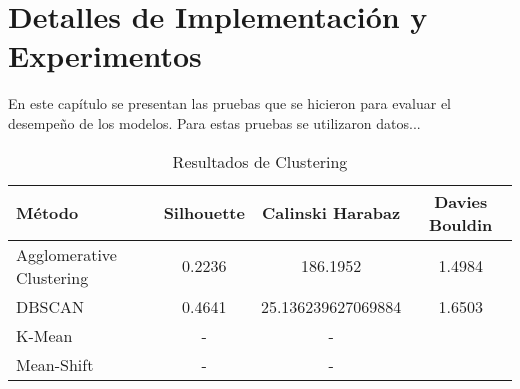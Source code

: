 \chapter{Detalles de Implementación y Experimentos}\label{chapter:implementation}

En este capítulo se presentan las pruebas que se hicieron para evaluar
 el desempeño de los modelos. Para estas pruebas se utilizaron datos...

\begin{table}[ht]
    \centering
    \caption{Resultados de Clustering}
    \begin{tabular}{lccc}
        \toprule
        \textbf{Método} & \textbf{Silhouette} & \textbf{Calinski Harabaz} & \textbf{Davies Bouldin} \\
        \midrule
        Agglomerative Clustering & 0.2236 & 186.1952 & 1.4984 \\
        DBSCAN & 0.4641 & 25.136239627069884 & 1.6503 \\
        K-Mean & - & - & \\
        Mean-Shift & - & - &
        \bottomrule
    \end{tabular}
\end{table}